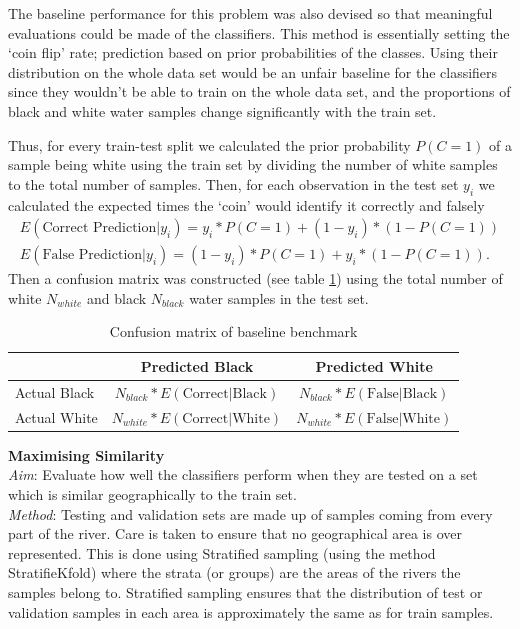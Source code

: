 The baseline performance for this problem was also devised so that meaningful evaluations could be made of the classifiers. This method is essentially setting the `coin flip' rate; prediction based on prior probabilities of the classes. Using their distribution on the whole data set would be an unfair baseline for the classifiers since they wouldn't be able to train on the whole data set, and the proportions of black and white water samples change significantly with the train set. 

Thus, for every train-test split we calculated the prior probability $P(C=1)$ of a sample being white using the train set by dividing the number of white samples to the total number of samples. Then, for each observation in the test set $y_i$ we calculated the expected times the `coin' would identify it correctly and falsely
\begin{align}
	E(\text{Correct Prediction}|y_i ) = y_i*P(C=1) + (1-y_i)*(1-P(C=1)) \\
	E(\text{False Prediction}|y_i) = (1-y_i)*P(C=1) + y_i*(1-P(C=1)).
\end{align}
Then a confusion matrix was constructed (see table \ref{table:baseline}) using the total number of white $N_{white}$ and black $N_{black}$ water samples in the test set.
\begin{table}[h]

	\centering

	\begin{tabularx}{\textwidth}{l| c c}
	 
		 &Predicted Black&Predicted White\\ 
		
		\hline
		Actual Black&$N_{black}*E(\text{Correct}|\text{Black} )$&$N_{black}*E(\text{False}|\text{Black})$\\
		Actual White& $N_{white}*E(\text{Correct}|\text{White} )$&$N_{white}*E(\text{False}|\text{White})$

	\end{tabularx}
	\caption{Confusion matrix of baseline benchmark}
		\label{table:baseline}
\end{table}

{ \large\bf Maximising Similarity} \\
\textit{Aim}: Evaluate how well the classifiers perform when they are tested on a set which is similar geographically to the train set.\\
\textit{Method}: Testing and validation sets are made up of samples coming from every part of the river. Care is taken to ensure that no geographical area is over represented. This is done using Stratified sampling (using the method StratifieKfold) where the strata (or groups) are the areas of the rivers the samples belong to. Stratified sampling ensures that the distribution of test or validation samples in each area is approximately the same as for train samples.




